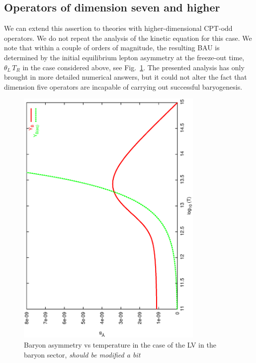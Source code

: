 \documentclass[12pt]{revtex4}
\begin{document}
\subsection{Operators of dimension seven and higher}

	We can extend this assertion to theories with higher-dimensional 
	CPT-odd operators. 
	We do not repeat the analysis of the kinetic equation 
	for this case.
	We note that within a couple of orders of magnitude, the resulting BAU
	is determined by the initial equilibrium lepton asymmetry
	at the freeze-out time, $ \theta_L\,T_R $ in the case considered
	above, see Fig.~\ref{b_dom_asymm_bau}.
	The presented analysis has only brought in more 
	detailed numerical answers, but it could not alter the fact that
	dimension five operators are incapable of carrying out successful
	baryogenesis.
\begin{figure}
\includegraphics[width=9cm,angle=270]{b_dom_asymm_bau.ps}
\caption{Baryon asymmetry vs temperature in the case of the LV in the baryon sector, {\it should be modified a bit}}
\label{b_dom_asymm_bau}
\end{figure}
\end{document}
